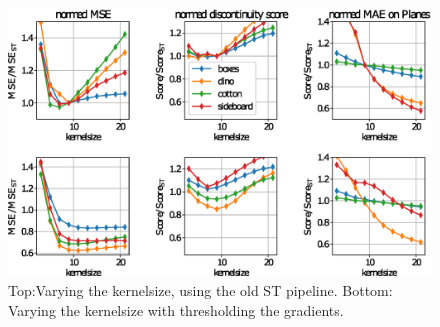 \documentclass  [
  paper    = a4,
  BCOR     = 10mm,
  twoside,
  fontsize = 12pt,
  fleqn,
  toc      = bibnumbered,
  toc      = listofnumbered,
  numbers  = noendperiod,
  headings = normal,
  listof   = leveldown,
  version  = 3.03
]                                       {scrreprt}
\begin{document}
\begin{figure}
	\centering
	\includegraphics[width=1\linewidth]{images/old_outer}
	\caption[Varying kernelsize]{Top:Varying the kernelsize, using the old ST pipeline. Bottom: Varying the kernelsize with thresholding the gradients.}
	\label{fig:oldouter}
\end{figure}
\end{document}
